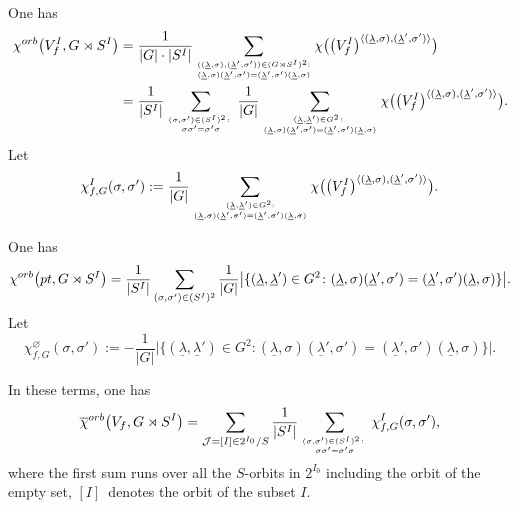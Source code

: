 \documentclass[11pt]{article}
\numberwithin{equation}{section}
\numberwithin{equation}{section}
\begin{document}
One has
\begin{align*}
{\chi}^{\rm orb}\big(V_f^I, G\rtimes S^I\big) & =\frac{1}{\vert G\vert\cdot\vert S^I\vert}
 \sum_{{((\underline{\lambda},\sigma),(\underline{\lambda}',\sigma'))\in (G\rtimes S^I)^2:}\atop
 {(\underline{\lambda},\sigma)(\underline{\lambda}',\sigma')=
 (\underline{\lambda}',\sigma')(\underline{\lambda},\sigma)}}
 \chi\big(\big(V_f^I\big)^{\langle(\underline{\lambda},\sigma),(\underline{\lambda}',\sigma')\rangle}\big)\\
 &= \frac{1}{\vert S^I\vert}\sum_{{(\sigma,\sigma')\in (S^I)^2\colon}\atop {\sigma\sigma'=\sigma'\sigma}}
 \frac{1}{\vert G\vert}
 \sum_{{(\underline{\lambda},\underline{\lambda}')\in G^2\colon }\atop
 {(\underline{\lambda},\sigma)(\underline{\lambda}',\sigma')=
 (\underline{\lambda}',\sigma')(\underline{\lambda},\sigma)}}
 \chi\big(\big(V_f^I\big)^{\langle(\underline{\lambda},\sigma),(\underline{\lambda}',\sigma')\rangle}\big).
\end{align*}
Let
\begin{gather}\label{eqn:chi_sigma}
 \chi_{f,G}^I(\sigma,\sigma'):=\frac{1}{\vert G\vert}
 \sum_{{(\underline{\lambda},\underline{\lambda}')\in G^2:}\atop
 {(\underline{\lambda},\sigma)(\underline{\lambda}',\sigma')=
 (\underline{\lambda}',\sigma')(\underline{\lambda},\sigma)}}
 \chi\big(\big(V_f^I\big)^{\langle(\underline{\lambda},\sigma),(\underline{\lambda}',\sigma')\rangle}\big).
\end{gather}

One has
\begin{gather*}
 {\chi}^{\rm orb}\big({\rm pt}, G\rtimes S^I\big) = \frac{1}{\vert S^I\vert}\sum_{(\sigma,\sigma')\in (S^I)^2}
\frac{1}{\vert G\vert}\big\vert\{(\underline{\lambda},\underline{\lambda}')\in G^2\colon
(\underline{\lambda},\sigma)(\underline{\lambda}',\sigma') =(\underline{\lambda}',\sigma')(\underline{\lambda},\sigma)
\}\big\vert.
\end{gather*}
Let
\[
 \chi_{f,G}^{\varnothing}(\sigma,\sigma'):= - \frac{1}{\vert G\vert}\big\vert\{(\underline{\lambda},\underline{\lambda}')
 \in G^2\colon
(\underline{\lambda},\sigma)(\underline{\lambda}',\sigma') =(\underline{\lambda}',\sigma')(\underline{\lambda},\sigma)
\}\big\vert.
\]

In these terms, one has
\begin{gather} \label{eqn:chi_f,G}
{\overline{\chi}}^{ \rm orb}\big(V_f, G\rtimes S^I\big) =
\sum_{{\mathcal J}=[I]\in 2^{I_0}/S} \frac{1}{\vert S^I\vert}
\sum_{{(\sigma,\sigma')\in (S^I)^2\colon }\atop {\sigma\sigma'=\sigma'\sigma}} \chi^I_{f,G}(\sigma, \sigma'),
\end{gather}
where the first sum runs over all the $S$-orbits in $2^{I_0}$ including the orbit of the empty set,
$[I]$~denotes the orbit of the subset $I$.
\end{document}
